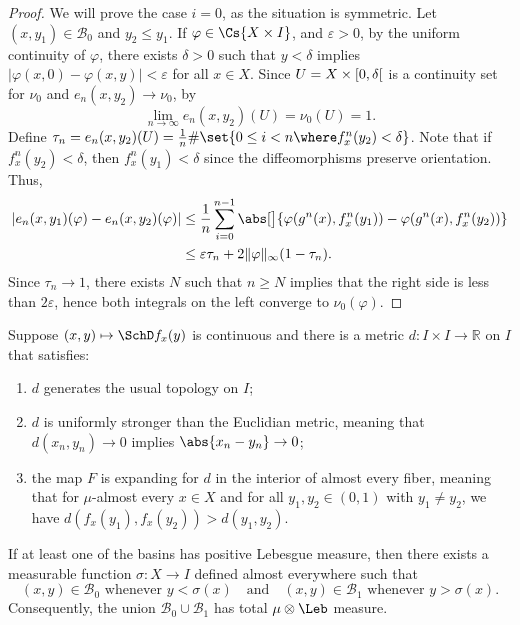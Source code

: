 \documentclass[../main.tex]{subfiles}
\begin{document}
\begin{proof}
  We will prove the case \(i = 0\), as the situation is symmetric. Let \((x,y_1) \in \mathcal{B}_0\) and \(y_2 \leq y_1\). If \(\varphi \in \Cs{X \times I}\), and \(\varepsilon > 0\), by the uniform continuity of \(\varphi\), there exists \(\delta > 0\) such that \(y < \delta\) implies \(\lvert \varphi(x,0) - \varphi(x,y) \rvert < \varepsilon\) for all \(x \in X\). Since \(U = X \times \interval[open right]{0}{\delta}\) is a continuity set for \(\nu_0\) and \(e_n(x,y_2) \to \nu_0\), by 
    \newcommand{\timeinU}{\frac{1}{n}\# \set{ 0 \leq i < n \where f_x^n(y_2) < \delta }}
    \[\lim_{n \to \infty} e_n(x,y_2)(U) = \nu_0(U) = 1.\]
    Define \(\tau_n = e_n(x,y_2)(U) = \timeinU\).
    Note that if \(f_x^n(y_2) < \delta\), then \(f_x^n(y_1) < \delta\) since the diffeomorphisms preserve orientation. Thus,
    \begin{align*}
      \lvert e_n(x,y_1)(\varphi) - e_n(x,y_2)(\varphi) \rvert
      &\leq \frac{1}{n}\sum_{i = 0}^{n - 1}\abs[\big]{\varphi(g^n(x),f_x^{n}(y_1)) - \varphi(g^n(x),f_x^{n}(y_2))}\\
      &\leq \varepsilon \tau_n + 2 \lVert \varphi \rVert_{\infty} (1 - \tau_n).
    \end{align*}
    Since \(\tau_n \to 1\), there exists \(N\) such that \(n \geq N\) implies that the right side is less than \(2 \varepsilon\), hence both integrals on the left converge to \(\nu_0(\varphi)\).
\end{proof}

\begin{theorem}\label{thm:neg-schwarz-sep-graph}
  Suppose \((x,y) \mapsto \SchD f_x(y)\) is continuous and there is a metric \(d \colon I \times I \to \mathbb{R}\) on \(I\) that satisfies:
  \begin{enumerate}
  \item \(d\) generates the usual topology on \(I\);
  \item \(d\) is uniformly stronger than the Euclidian metric, meaning that \(d(x_n,y_n) \to 0\) implies \(\abs{x_n - y_n} \to 0\);
  \item the map \(F\) is expanding for \(d\) in the interior of almost every fiber, meaning that for \(\mu\)-almost every \(x \in X\) and for all \(y_1,y_2 \in (0,1)\) with \(y_1 \neq y_2\), we have \(d(f_x(y_1),f_x(y_2)) > d(y_1,y_2)\).
  \end{enumerate}
  If at least one of the basins has positive Lebesgue measure, then there exists a measurable function \(\sigma \colon X \to I\) defined almost everywhere such that
  \begin{equation*}
    (x,y) \in \mathcal{B}_0 \text{ whenever } y < \sigma(x) \quad \text{and} \quad (x,y) \in \mathcal{B}_1 \text{ whenever }y > \sigma(x).
  \end{equation*}
  Consequently, the union \(\mathcal{B}_0 \cup \mathcal{B}_1\) has total \(\mu \otimes \Leb\) measure.
\end{theorem}
\end{document}
